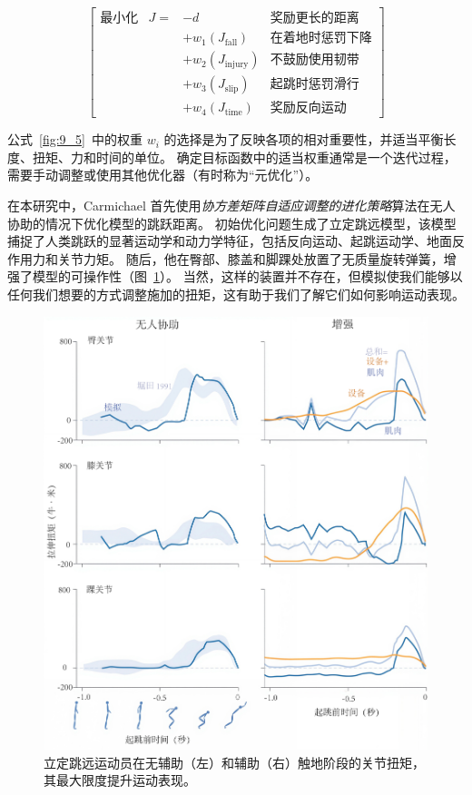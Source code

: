 \begin{equation}
	\begin{bmatrix}
		\text{最小化} & J= & -d & \text{奖励更长的距离} \\
		& & + w_1 (J_\text{fall}) & \text{在着地时惩罚下降} \\
		& & + w_2 (J_\text{injury}) & \text{不鼓励使用韧带} \\
		& & + w_3 (J_\text{slip}) & \text{起跳时惩罚滑行} \\
		& & + w_4 (J_\text{time}) & \text{奖励反向运动}
	\end{bmatrix}
	\label{eq:9_5}
\end{equation}

公式~\ref{fig:9_5}~中的权重 $w_i$ 的选择是为了反映各项的相对重要性，并适当平衡长度、扭矩、力和时间的单位。
确定目标函数中的适当权重通常是一个迭代过程，需要手动调整或使用其他优化器（有时称为“元优化”）。


在本研究中，Carmichael 首先使用\textit{协方差矩阵自适应调整的进化策略}算法在无人协助的情况下优化模型的跳跃距离。
初始优化问题生成了立定跳远模型，该模型捕捉了人类跳跃的显著运动学和动力学特征，包括反向运动、起跳运动学、地面反作用力和关节力矩。
随后，他在臀部、膝盖和脚踝处放置了无质量旋转弹簧，增强了模型的可操作性（图~\ref{fig:9_17}）。
当然，这样的装置并不存在，但模拟使我们能够以任何我们想要的方式调整施加的扭矩，这有助于我们了解它们如何影响运动表现。


\begin{figure}[!htb]
	\centering
	\includegraphics[width=1.0\linewidth]{chap9/9_17}
	\caption{立定跳远运动员在无辅助（左）和辅助（右）触地阶段的关节扭矩，其最大限度提升运动表现\cite{horita1991body}。 \label{fig:9_17}}
\end{figure}


